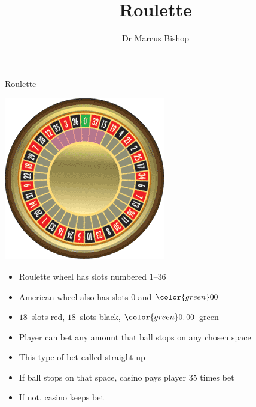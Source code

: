 \documentclass[handout]{beamer}
\title[Roulette]{Roulette}
\author{Dr Marcus Bishop}
\theoremstyle{definition}
\begin{document}
\begin{frame}\titlepage\end{frame}
\LogoOff
\begin{frame}{Roulette}
\begin{multicols}{2}
\includegraphics[scale=.38]{Roulette}
\begin{itemize}
\item Roulette wheel has slots numbered $1$--$36$
\columnbreak
\item American wheel also has slots {\color{green}$0$}
and ${\color{green}00}$
\item $18$~slots red, $18$~slots black,
{$\color{green}0,00$} green
\item Player can bet any amount that ball stops
on any chosen space
\item This type of bet called \alert{straight up}
\item If ball stops on that space, casino pays player
$35$ times bet
\item If not, casino keeps bet
\end{itemize}
\end{multicols}
\end{frame}
\end{document}
